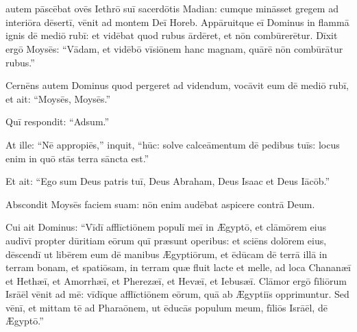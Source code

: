 \chapter{}

\thispagestyle{empty}

 autem pāscēbat ovēs Iethrō suī sacerdōtis Madian:
cumque mināsset gregem ad interiōra dēsertī,
vēnit ad montem Deī Horeb.
Appāruitque eī Dominus in flammā ignis dē mediō rubī:
et vidēbat quod rubus ārdēret, et nōn combūrerētur.
Dīxit ergō Moysēs: ``Vādam, et vidēbō vīsiōnem hanc magnam, quārē nōn combūrātur rubus.''

Cernēns autem Dominus quod pergeret ad videndum,
vocāvit eum dē mediō rubī, et ait: ``Moysēs, Moysēs.''

Quī respondit: ``Adsum.''

At ille: ``Nē appropiēs,'' inquit, ``hūc: solve calceāmentum dē pedibus tuīs: locus enim
in quō stās terra sāncta est.'' 

Et ait: ``Ego sum Deus patris tuī, Deus Abraham, Deus Isaac et Deus Iācōb.''

Abscondit Moysēs faciem suam: nōn enim audēbat aspicere contrā Deum.

Cui ait Dominus: ``Vīdī afflīctiōnem populī meī in Ægyptō,
et clāmōrem eius audīvī propter dūritiam eōrum quī præsunt operibus:
et sciēns dolōrem eius, dēscendī ut libērem eum dē manibus Ægyptiōrum,
et ēdūcam dē terrā illā in terram bonam, et spatiōsam,
in terram quæ fluit lacte et melle,
 ad loca Chananæī et Hethæī, et Amorrhæī, et Pherezæī, et Hevæī, et Iebusæī.
Clāmor ergō fīliōrum Isrāēl vēnit ad mē: vīdīque afflīctiōnem eōrum,
quā ab Ægyptiīs opprimuntur.
Sed vēnī, et mittam tē ad Pharaōnem,
ut ēducās populum meum, fīliōs Isrāēl, dē Ægyptō.''

